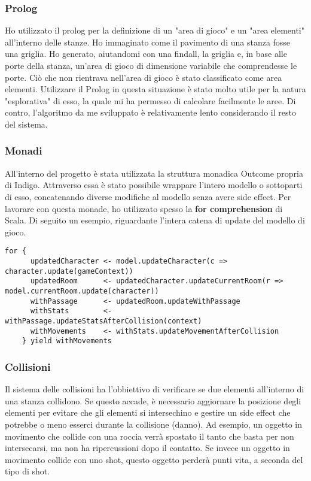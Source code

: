 \subsubsection{Prolog}
Ho utilizzato il prolog per la definizione di un "area di gioco" e un "area elementi" all'interno delle stanze. Ho immaginato come il pavimento di una stanza fosse una griglia. 
Ho generato, aiutandomi con una findall, la griglia e, in base alle porte della stanza, un'area di gioco di dimensione variabile che comprendesse le porte. 
Ciò che non rientrava nell'area di gioco è stato classificato come area elementi.
Utilizzare il Prolog in questa situazione è stato molto utile per la natura "esplorativa" di esso, la quale mi ha permesso di calcolare facilmente le aree. Di contro, l'algoritmo da me sviluppato è relativamente lento considerando il resto del sistema. 

\subsubsection{Monadi}
All'interno del progetto è stata utilizzata la struttura monadica Outcome propria di Indigo. 
Attraverso essa è stato possibile wrappare l'intero modello o sottoparti di esso, concatenando diverse modifiche al modello senza avere side effect. Per lavorare con questa monade, ho utilizzato spesso la \textbf{for comprehension} di Scala. 
Di seguito un esempio, riguardante l'intera catena di update del modello di gioco. 
\begin{lstlisting}[basicstyle=\tiny]
for {
      updatedCharacter <- model.updateCharacter(c => character.update(gameContext))
      updatedRoom      <- updatedCharacter.updateCurrentRoom(r => model.currentRoom.update(character))
      withPassage      <- updatedRoom.updateWithPassage
      withStats        <- withPassage.updateStatsAfterCollision(context)
      withMovements    <- withStats.updateMovementAfterCollision
    } yield withMovements
\end{lstlisting}

\subsubsection{Collisioni}
Il sistema delle collisioni ha l'obbiettivo di verificare se due elementi all'interno di una stanza collidono. 
Se questo accade, è necessario aggiornare la posizione degli elementi per evitare che gli elementi si intersechino e gestire un side effect che potrebbe o meno esserci durante la collisione (danno). 
Ad esempio, un oggetto in movimento che collide con una roccia verrà spostato il tanto che basta per non intersecarsi, ma non ha ripercussioni dopo il contatto. 
Se invece un oggetto in movimento collide con uno shot, questo oggetto perderà punti vita, a seconda del tipo di shot. 

